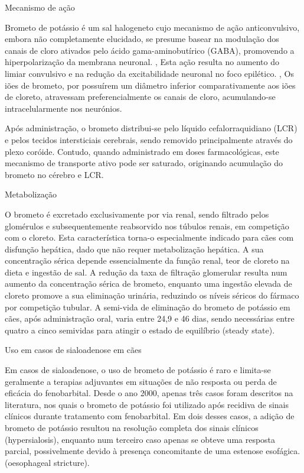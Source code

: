 Mecanismo de ação


Brometo de potássio é um sal halogeneto \cite{javmakbr} cujo mecanismo de ação anticonvulsivo, embora não completamente elucidado, se presume basear na modulação dos canais de cloro ativados pelo ácido gama-aminobutírico (GABA), promovendo a hiperpolarização da membrana neuronal. \cite{javmakbr}, \cite{Fantinati2021} \cite{Gouveia2024} Esta ação resulta no aumento do limiar convulsivo e na redução da excitabilidade neuronal no foco epilético. \cite{javmakbr}, \cite{Fantinati2021} \cite{Gouveia2024} Os iões de brometo, por possuírem um diâmetro inferior comparativamente aos iões de cloreto, atravessam preferencialmente os canais de cloro, acumulando-se intracelularmente nos neurónios. \cite{javmakbr} \cite{Gouveia2024} 


Após administração, o brometo distribui-se pelo líquido cefalorraquidiano (LCR) e pelos tecidos intersticiais cerebrais, sendo removido principalmente através do plexo coróide. \cite{javmakbr} Contudo, quando administrado em doses farmacológicas, este mecanismo de transporte ativo pode ser saturado, originando acumulação do brometo no cérebro e LCR. \cite{javmakbr}

Metabolização 


O brometo é excretado exclusivamente por via renal, sendo filtrado pelos glomérulos e subsequentemente reabsorvido nos túbulos renais, em competição com o cloreto. \cite{Fantinati2021} Esta característica torna-o especialmente indicado para cães com disfunção hepática, dado que não requer metabolização hepática. A sua concentração sérica depende essencialmente da função renal, teor de cloreto na dieta e ingestão de sal. A redução da taxa de filtração glomerular resulta num aumento da concentração sérica de brometo, enquanto uma ingestão elevada de cloreto promove a sua eliminação urinária, reduzindo os níveis séricos do fármaco por competição tubular. A semi-vida de eliminação do brometo de potássio em cães, após administração oral, varia entre 24,9 e 46 dias, sendo necessárias entre quatro a cinco semividas para atingir o estado de equilíbrio (steady state).


Uso em casos de sialoadenose em cães


Em casos de sialoadenose, o uso de brometo de potássio é raro e limita-se geralmente a terapias adjuvantes em situações de não resposta ou perda de eficácia do fenobarbital. Desde o ano 2000, apenas três casos foram descritos na literatura, nos quais o brometo de potássio foi utilizado após recidiva de sinais clínicos durante tratamento com fenobarbital. Em dois desses casos, a adição de brometo de potássio resultou na resolução completa dos sinais clínicos (hypersialosis), enquanto num terceiro caso apenas se obteve uma resposta parcial, possivelmente devido à presença concomitante de uma estenose esofágica. (oesophageal stricture). 


